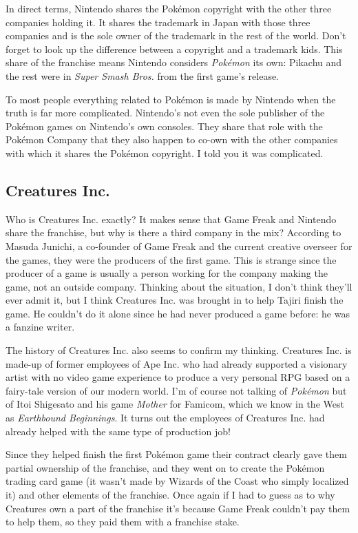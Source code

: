 \documentclass{book}
\begin{document}
In direct terms, Nintendo shares the Pokémon copyright with the other three companies holding it. It shares the trademark in Japan with those three companies and is the sole owner of the trademark in the rest of the world. Don’t forget to look up the difference between a copyright and a trademark kids. This share of the franchise means Nintendo considers \emph{Pokémon} its own: Pikachu and the rest were in \emph{Super Smash Bros.} from the first game’s release.\par
To most people everything related to Pokémon is made by Nintendo when the truth is far more complicated. Nintendo’s not even the sole publisher of the Pokémon games on Nintendo’s own consoles. They share that role with the Pokémon Company that they also happen to co-own with the other companies with which it shares the Pokémon copyright. I told you it was complicated.\par
\FloatBarrier\subsection*{Creatures Inc.}
Who is Creatures Inc. exactly? It makes sense that Game Freak and Nintendo share the franchise, but why is there a third company in the mix? According to Masuda Junichi, a co-founder of Game Freak and the current creative overseer for the games, they were the producers of the first game. This is strange since the producer of a game is usually a person working for the company making the game, not an outside company. Thinking about the situation, I don’t think they’ll ever admit it, but I think Creatures Inc. was brought in to help Tajiri finish the game. He couldn’t do it alone since he had never produced a game before: he was a fanzine writer.\par
The history of Creatures Inc. also seems to confirm my thinking. Creatures Inc. is made-up of former employees of Ape Inc. who had already supported a visionary artist with no video game experience to produce a very personal RPG based on a fairy-tale version of our modern world. I’m of course not talking of \emph{Pokémon} but of Itoi Shigesato and his game \emph{Mother} for Famicom, which we know in the West as \emph{Earthbound Beginnings}. It turns out the employees of Creatures Inc. had already helped with the same type of production job!\par
Since they helped finish the first Pokémon game their contract clearly gave them partial ownership of the franchise, and they went on to create the Pokémon trading card game (it wasn’t made by Wizards of the Coast who simply localized it) and other elements of the franchise. Once again if I had to guess as to why Creatures own a part of the franchise it’s because Game Freak couldn’t pay them to help them, so they paid them with a franchise stake.\par
\end{document}
